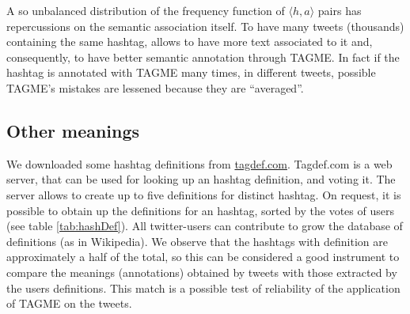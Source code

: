 \documentclass[a4paper,11pt,oneside]{article}
\newcommand{\ha}{$\langle h,a \rangle$\xspace}
\begin{document}

A so unbalanced distribution of the frequency function of \ha pairs has repercussions on the semantic association itself. To have many tweets (thousands) containing the same hashtag, allows to have more text associated to it and, consequently, to have better semantic annotation through TAGME.
In fact if the hashtag is annotated with TAGME many times, in different tweets, possible TAGME's mistakes are lessened because they are ``averaged''.



\subsection{Other meanings}
We downloaded some hashtag definitions from \href{http://tagdef.com/}{tagdef.com}. Tagdef.com is a web server, that can be used for looking up an hashtag definition, and voting it.
The server allows to create up to five definitions for distinct hashtag. On request, it is possible to obtain up the definitions for an hashtag, sorted by the votes of users (see table \ref{tab:hashDef}). All twitter-users can contribute to grow the database of definitions (as in Wikipedia).
We observe that the hashtags with definition are approximately a half of the total, so this can be considered a good instrument to compare the meanings (annotations) obtained by tweets with those extracted by the users definitions.
This match is a possible test of reliability of the application of TAGME on the tweets. %
\end{document}
